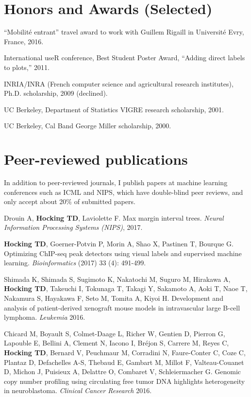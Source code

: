 \documentclass[margin,line]{res}
\begin{document}
\begin{resume}
\section{\sc Honors and Awards (Selected)}

``Mobilit\'e entrant'' travel award to work with Guillem Rigaill in
Universit\'e Evry, France, 2016.

International useR conference, Best Student Poster Award, ``Adding
direct labels to plots,'' 2011.

INRIA/INRA (French computer science and agricultural research institutes), Ph.D. scholarship, 2009 (declined).

UC Berkeley, Department of Statistics VIGRE research scholarship, 2001.

UC Berkeley, Cal Band George Miller scholarship, 2000.

\section{\sc Peer-reviewed publications}

In addition to peer-reviewed journals, I publish papers at
machine learning conferences such as ICML and NIPS, which have
double-blind peer reviews, and only accept about 20\% of submitted
papers.

Drouin A, {\bf Hocking TD}, Laviolette F. Max margin interval
trees. {\it Neural Information Processing Systems (NIPS)}, 2017.

{\bf Hocking TD}, Goerner-Potvin P, Morin A, Shao X, Pastinen T,
Bourque G. Optimizing ChIP-seq peak detectors using visual labels and
supervised machine learning. {\it Bioinformatics} (2017) 33 (4): 491-499.

Shimada K, Shimada S, Sugimoto K, Nakatochi M, Suguro M, Hirakawa A,
{\bf Hocking TD}, Takeuchi I, Tokunaga T, Takagi Y, Sakamoto A, Aoki T, Naoe
T, Nakamura S, Hayakawa F, Seto M, Tomita A, Kiyoi H. Development and
analysis of patient-derived xenograft mouse models in intravascular
large B-cell lymphoma. {\it Leukemia} 2016.

Chicard M, Boyault S, Colmet-Daage L, Richer W, Gentien D, Pierron G,
Lapouble E, Bellini A, Clement N, Iacono I, Bréjon S, Carrere M, Reyes
C, {\bf Hocking TD}, Bernard V, Peuchmaur M, Corradini N, Faure-Conter
C, Coze C, Plantaz D, Defachelles A-S, Thebaud E, Gambart M, Millot F,
Valteau-Couanet D, Michon J, Puisieux A, Delattre O, Combaret V,
Schleiermacher G. Genomic copy number profiling using circulating free
tumor DNA highlights heterogeneity in neuroblastoma. {\it Clinical Cancer
Research} 2016.


\end{resume}
\end{document}
